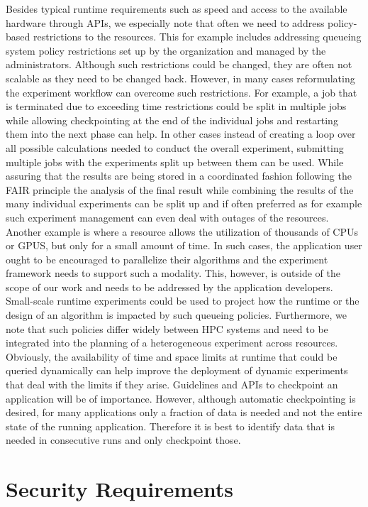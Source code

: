 \documentclass[utf8]{FrontiersinVancouver} %
\begin{document}
Besides typical runtime requirements such as speed and access to the available hardware through APIs, we especially note that often we need to address policy-based restrictions to the resources. This for example includes addressing queueing system policy restrictions set up by the organization and managed by the administrators. Although such restrictions could be changed, they are often not scalable as they need to be changed back. However, in many cases reformulating the experiment workflow can overcome such restrictions. For example, a job that is terminated due to exceeding time restrictions could be split in multiple jobs while allowing checkpointing at the end of the individual jobs and restarting them into the next phase can help. In other cases instead of creating a loop over all possible calculations needed to conduct the overall experiment, submitting multiple jobs with the experiments split up between them can be used. While assuring that the results are being stored in a coordinated fashion following the FAIR principle the analysis of the final result while combining the results of the many individual experiments can be split up and if often preferred as for example such experiment management can even deal with outages of the resources. Another example is where a resource allows the utilization of thousands of CPUs or GPUS, but only for a small amount of time. In such cases, the application user ought to be encouraged to parallelize their algorithms and the experiment framework needs to support such a modality. This, however, is outside of the scope of our work and needs to be addressed by the application developers. Small-scale runtime experiments could be used to project how the runtime or the design of an algorithm is impacted by such queueing policies.
Furthermore, we note that such policies differ widely between HPC systems and need to be integrated into the planning of a heterogeneous experiment across resources. Obviously, the availability of time and space limits at runtime that could be queried dynamically can help improve the deployment of dynamic experiments that deal with the limits if they arise. Guidelines and APIs to checkpoint an application will be of importance. However, although automatic checkpointing is desired, for many applications only a fraction of data is needed and not the entire state of the running application. Therefore it is best to identify data that is needed in consecutive runs and only checkpoint those.


\section{Security Requirements}
\end{document}
